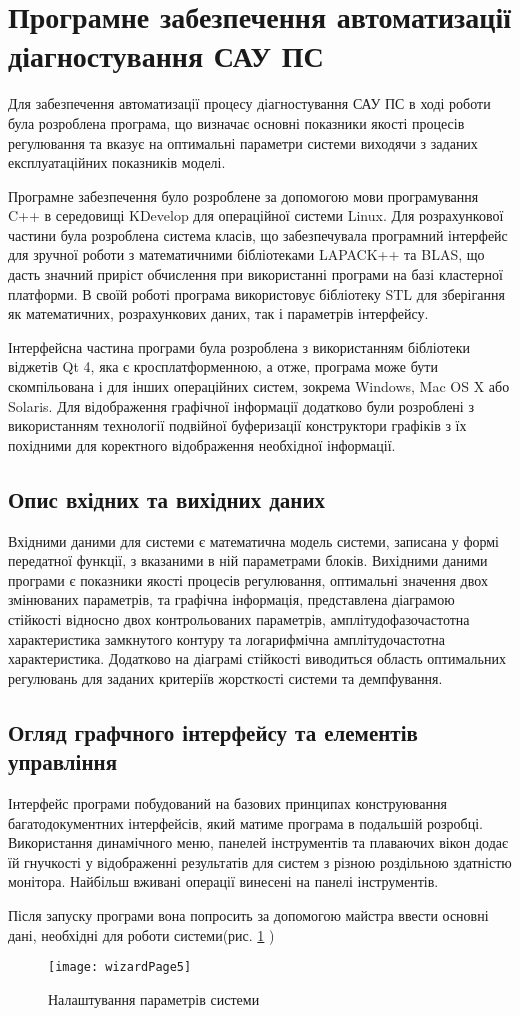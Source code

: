 \section{Програмне забезпечення автоматизації діагностування САУ ПС}

Для забезпечення автоматизації процесу діагностування САУ ПС в ході 
роботи була розроблена програма, що визначає основні показники якості 
процесів регулювання та вказує на оптимальні параметри системи виходячи 
з заданих експлуатаційних показників моделі. 

Програмне забезпечення було розроблене за допомогою мови програмування C++ в 
середовищі KDevelop для операційної системи Linux. Для розрахункової частини 
була розроблена система класів, що забезпечувала програмний інтерфейс для 
зручної роботи з математичними бібліотеками LAPACK++ та BLAS, що дасть 
значний приріст обчислення при використанні програми на базі кластерної 
платформи. В своїй роботі програма використовує бібліотеку STL для зберігання 
як математичних, розрахункових даних, так і параметрів інтерфейсу.

Інтерфейсна частина програми була розроблена з використанням бібліотеки 
віджетів Qt 4, яка є кросплатформенною, а отже, програма може бути 
скомпільована і для інших операційних систем, зокрема Windows, Mac OS X або 
Solaris. Для відображення графічної інформації додатково були розроблені з 
використанням технології подвійної буферизації конструктори графіків з їх 
похідними для коректного відображення необхідної інформації.


\subsection{Опис вхідних та вихідних даних}
Вхідними даними для системи є математична модель системи, записана у 
формі передатної функції, з вказаними в ній параметрами блоків. 
Вихідними даними програми є показники якості процесів регулювання, 
оптимальні значення двох змінюваних параметрів, та графічна інформація, 
представлена діаграмою стійкості відносно двох контрольованих параметрів, 
амплітудофазочастотна характеристика замкнутого контуру та логарифмічна 
амплітудочастотна характеристика. Додатково на діаграмі стійкості 
виводиться область оптимальних регулювань для заданих критеріїв жорсткості 
системи та демпфування.

\subsection{Огляд графчного інтерфейсу та елементів управління}
Інтерфейс програми побудований на базових принципах конструювання 
багатодокументних інтерфейсів, який матиме програма в подальшій розробці. 
Використання динамічного меню, панелей інструментів та плаваючих вікон додає 
їй гнучкості у відображенні результатів для систем з різною роздільною 
здатністю монітора. Найбільш вживані операції винесені на панелі інструментів.

Після запуску програми вона попросить за допомогою майстра ввести основні дані,
 необхідні для роботи системи(рис. \ref{fig:wizard} )

\begin{figure}
\centering
\texttt{[image: wizardPage5]}
\caption{Налаштування параметрів системи}
\label{fig:wizard}
\end{figure} 

